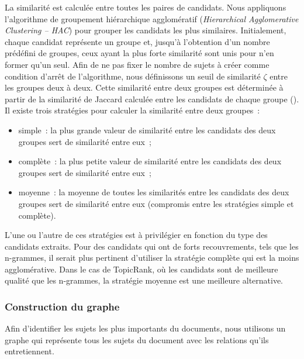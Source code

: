         La similarité est calculée entre toutes les paires de candidats. Nous
        appliquons l'algorithme de groupement hiérarchique agglomératif
        (\textit{Hierarchical Agglomerative Clustering -- \textsc{HAC}}) pour
        grouper les candidats les plus similaires. Initialement, chaque candidat
        représente un groupe et, jusqu'à l'obtention d'un nombre prédéfini de
        groupes, ceux ayant la plus forte similarité sont unis pour n'en former
        qu'un seul. Afin de ne pas fixer le nombre de sujets à créer comme
        condition d'arrêt de l'algorithme, nous définissons un seuil de
        similarité $\zeta$ entre les groupes deux à deux. Cette similarité entre
        deux groupes est déterminée à partir de la similarité de Jaccard
        calculée entre les candidats de chaque groupe (). Il
        existe trois stratégies pour calculer la similarité entre deux groupes~:
        \begin{itemize}
          \item{simple~: la plus grande valeur de similarité entre les candidats
                des deux groupes sert de similarité entre eux~;}
          \item{complète~: la plus petite valeur de similarité entre les
                candidats des deux groupes sert de similarité entre eux~;}
          \item{moyenne~: la moyenne de toutes les similarités entre les
                candidats des deux groupes sert de similarité entre eux
                (compromis entre les stratégies simple et complète).}
        \end{itemize}
        L'une ou l'autre de ces stratégies est à privilégier en fonction du type
        des candidats extraits. Pour des candidats qui ont de forts
        recouvrements, tels que les n-grammes, il serait plus pertinent
        d'utiliser la stratégie complète qui est la moins agglomérative. Dans le
        cas de TopicRank, où les candidats sont de meilleure qualité que les
        n-grammes, la stratégie moyenne est une meilleure alternative.


      \subsubsection{Construction du graphe}
      \label{subsubsec:main:domain_independent_keyphrase_extraction-unsupervised_automatic_keyphrase_extraction-topicrank-graph_construction}
        Afin d'identifier les sujets les plus importants du documents, nous
        utilisons un graphe qui représente tous les sujets du document avec les
        relations qu'ils entretiennent.

